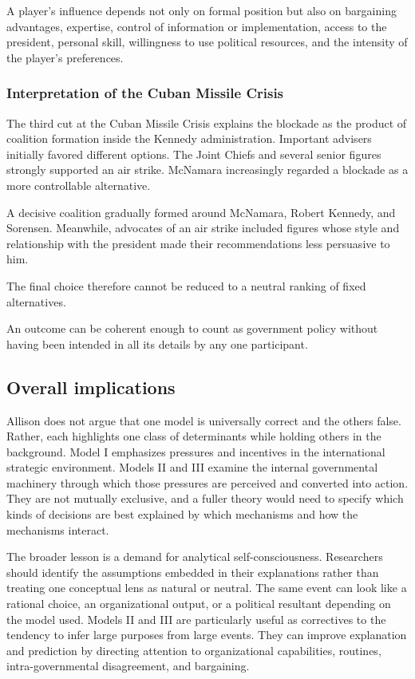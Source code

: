 A player's influence depends not only on formal position but also on bargaining advantages, expertise, control of information or implementation, access to the president, personal skill, willingness to use political resources, and the intensity of the player's preferences.

\subsubsection{Interpretation of the Cuban Missile Crisis}
The third cut at the Cuban Missile Crisis explains the blockade as the product of coalition formation inside the Kennedy administration. Important advisers initially favored different options. The Joint Chiefs and several senior figures strongly supported an air strike. McNamara increasingly regarded a blockade as a more controllable alternative.

A decisive coalition gradually formed around McNamara, Robert Kennedy, and Sorensen. Meanwhile, advocates of an air strike included figures whose style and relationship with the president made their recommendations less persuasive to him.

The final choice therefore cannot be reduced to a neutral ranking of fixed alternatives.

An outcome can be coherent enough to count as government policy without having been intended in all its details by any one participant.

\subsection{Overall implications}

Allison does not argue that one model is universally correct and the others false. Rather, each highlights one class of determinants while holding others in the background. Model I emphasizes pressures and incentives in the international strategic environment. Models II and III examine the internal governmental machinery through which those pressures are perceived and converted into action. They are not mutually exclusive, and a fuller theory would need to specify which kinds of decisions are best explained by which mechanisms and how the mechanisms interact.

The broader lesson is a demand for analytical self-consciousness. Researchers should identify the assumptions embedded in their explanations rather than treating one conceptual lens as natural or neutral. The same event can look like a rational choice, an organizational output, or a political resultant depending on the model used. Models II and III are particularly useful as correctives to the tendency to infer large purposes from large events. They can improve explanation and prediction by directing attention to organizational capabilities, routines, intra-governmental disagreement, and bargaining.

